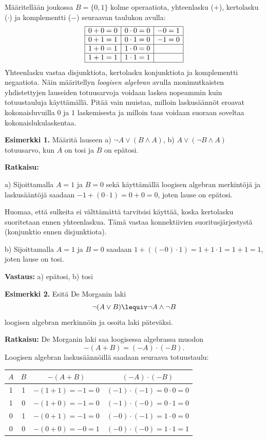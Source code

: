 \item
Määritellään joukossa $B=\{0,1\}$ kolme operaatiota, yhteenlasku ($+$), kertolasku ($\cdot$) ja komplementti ($-$) seuraavan taulukon avulla:
\[
\begin{array}{|c|c|c|}
\hline
0+0=0 & 0\cdot0=0 & - 0=1\\
\hline
0+1=1 & 0\cdot1=0 & - 1=0\\
\hline
1+0=1 & 1\cdot0=0 & \\
\hline
1+1=1 & 1\cdot1=1 & \\
\hline
\end{array}
\]
Yhteenlasku vastaa disjunktiota, kertolasku konjunktiota ja komplementti negaatiota. Näin määritellyn {\em loogisen algebran} avulla monimutkaisten yhdistettyjen lauseiden totuusarvoja voidaan laskea nopeammin kuin totuustauluja käyttämällä. Pitää vain muistaa, milloin lasku\-sään\-nöt eroavat kokonaisluvuilla $0$ ja $1$ laskemisesta ja milloin taas voidaan suoraan soveltaa kokonaislukulaskentaa.


{\bf Esimerkki 1.}
Määritä lauseen
 a) $\lnot A \lor (B\land A)$,  b) $A\lor (\lnot B \land A)$  
totuusarvo, kun $A$ on tosi ja $B$ on epätosi.

{\bf Ratkaisu:}

a) Sijoittamalla $A=1$ ja $B=0$ sekä käyttämällä loogisen algebran merkintöjä ja laskusääntöjä saadaan $-1+(0\cdot 1) = 0 + 0 =  0$, joten lause on epätosi.

Huomaa, että sulkeita ei välttämättä tarvitsisi käyttää, koska kertolasku suoritetaan ennen yhteenlaskua. Tämä vastaa konnektiivien suoritusjärjestystä (konjunktio ennen disjunktiota).

b) Sijoittamalla $A=1$ ja $B=0$ saadaan $1 + ((- 0)\cdot1) = 1 + 1\cdot1 = 1 + 1 = 1$, joten lause on tosi.

{\bf Vastaus:} a) epätosi, b) tosi

{\bf Esimerkki 2.}
Esitä De Morganin laki
\[
\lnot (A\lor B) \lequiv \lnot A\land \lnot B
\]
loogisen algebran merkinnöin ja osoita laki päteväksi.

{\bf Ratkaisu:}
De Morganin laki saa loogisessa algebrassa muodon
\[
- (A + B) =( - A )\cdot( - B ).
\]
Loogisen algebran laskusäännöillä saadaan seuraava totuustaulu:

\begin{tabular}{|c|c|c|c|}
\hline
$A$ & $B$ & $- (A + B)$ & $( - A )\cdot( - B )$\\ \hline
1 & 1 & $- (1 + 1) = - 1 = 0$ & $( - 1 )\cdot ( - 1 ) = 0\cdot 0
= 0$\\ \hline
1 & 0 & $- (1 + 0) = - 1 = 0$ & $( - 1 )\cdot ( - 0 ) = 0\cdot 1
= 0$\\ \hline
0 & 1 & $- (0 + 1) = - 1 = 0$ & $( - 0 )\cdot( - 1 ) = 1\cdot 0 =
0$\\ \hline
0 & 0 & $- (0 + 0) = - 0 = 1$ & $( - 0 )\cdot( - 0 ) = 1\cdot 1 =
1$\\ \hline
\end{tabular}

